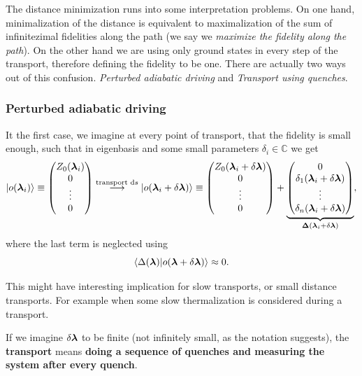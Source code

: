 The distance minimization runs into some interpretation problems. On one hand, minimalization of the distance is equivalent to maximalization of the sum of infinitezimal fidelities along the path (we say we \emph{maximize the fidelity along the path}). On the other hand we are using only ground states in every step of the transport, therefore defining the fidelity to be one. There are actually two ways out of this confusion. \emph{Perturbed adiabatic driving} and \emph{Transport using quenches}.


\subsubsection{Perturbed adiabatic driving}
It the first case, we imagine at every point of transport, that the fidelity is small enough, such that in eigenbasis and some small parameters $\delta_i\in \mathbb{C}$ we get
$$\ket{o({\bm\lambda}_i)}\equiv \begin{pmatrix}
    Z_0({\bm\lambda}_i)\\
    0\\
    \vdots \\
    0
\end{pmatrix} \overset{\text{transport }\mathrm{d} s}{\longrightarrow} \ket{o({\bm\lambda}_i+\delta {\bm\lambda})}\equiv\begin{pmatrix}
    Z_0({\bm\lambda}_i+\delta {\bm\lambda})\\
    0\\
    \vdots \\
    0
\end{pmatrix} +\underbrace{\begin{pmatrix}
    0\\
    \delta_1({\bm\lambda}_i+\delta {\bm\lambda})\\
    \vdots \\
    \delta_n({\bm\lambda}_i+\delta {\bm\lambda})
\end{pmatrix}}_{\mathbf{\Delta}({\bm\lambda}_i+\delta {\bm\lambda})}, $$
where the last term is neglected using 
$$\braket{\Delta({\bm\lambda})|o({\bm\lambda}+\delta{\bm\lambda})}\approx 0.$$

This might have interesting implication for slow transports, or small distance transports. For example when some slow thermalization is considered during a transport.




If we imagine $\delta{\bm\lambda}$ to be finite (not infinitely small, as the notation suggests), the \textbf{transport} means \textbf{doing a sequence of quenches and measuring the system after every quench}.


